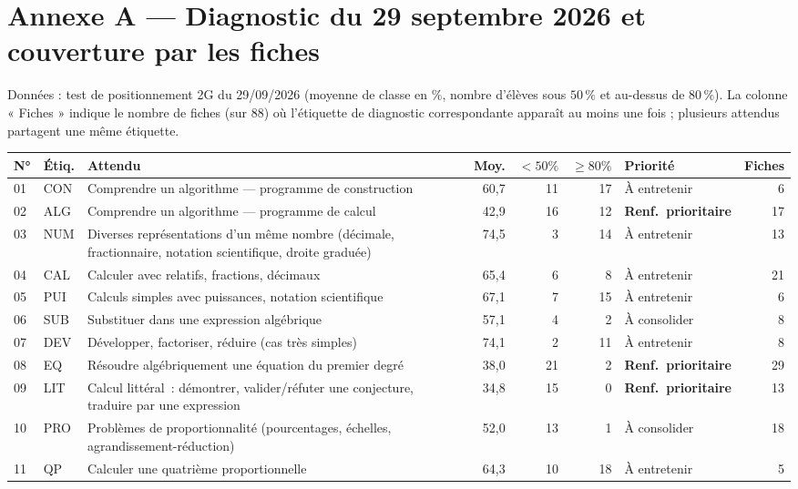 \section{Annexe A — Diagnostic du 29 septembre 2026 et couverture par les fiches}
Données : test de positionnement 2G du 29/09/2026 (moyenne de classe en \%, nombre d'élèves sous $50\,\%$ et au-dessus de $80\,\%$). La colonne « Fiches » indique le nombre de fiches (sur $88$) où l'étiquette de diagnostic correspondante apparaît au moins une fois ; plusieurs attendus partagent une même étiquette.\par\smallskip
{\footnotesize\renewcommand{\arraystretch}{1.15}\begin{tabular}{@{}l l p{7.6cm} r r r l r@{}}\toprule
N° & Étiq. & Attendu & Moy. & $<50\%$ & $\geqslant80\%$ & Priorité & Fiches \\ \midrule
01 & CON & Comprendre un algorithme — programme de construction & 60,7 & 11 & 17 & À entretenir & 6 \\
02 & ALG & Comprendre un algorithme — programme de calcul & 42,9 & 16 & 12 & \textbf{Renf.\ prioritaire} & 17 \\
03 & NUM & Diverses représentations d'un même nombre (décimale, fractionnaire, notation scientifique, droite graduée) & 74,5 & 3 & 14 & À entretenir & 13 \\
04 & CAL & Calculer avec relatifs, fractions, décimaux & 65,4 & 6 & 8 & À entretenir & 21 \\
05 & PUI & Calculs simples avec puissances, notation scientifique & 67,1 & 7 & 15 & À entretenir & 6 \\
06 & SUB & Substituer dans une expression algébrique & 57,1 & 4 & 2 & À consolider & 8 \\
07 & DEV & Développer, factoriser, réduire (cas très simples) & 74,1 & 2 & 11 & À entretenir & 8 \\
08 & EQ & Résoudre algébriquement une équation du premier degré & 38,0 & 21 & 2 & \textbf{Renf.\ prioritaire} & 29 \\
09 & LIT & Calcul littéral~: démontrer, valider/réfuter une conjecture, traduire par une expression & 34,8 & 15 & 0 & \textbf{Renf.\ prioritaire} & 13 \\
10 & PRO & Problèmes de proportionnalité (pourcentages, échelles, agrandissement-réduction) & 52,0 & 13 & 1 & À consolider & 18 \\
11 & QP & Calculer une quatrième proportionnelle & 64,3 & 10 & 18 & À entretenir & 5 \\

\end{tabular}}
